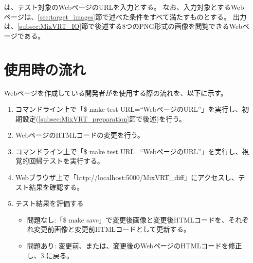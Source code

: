 
\toolName は、テスト対象のWebページのURLを入力とする。
なお、入力対象とするWebページは、\ref{sec:target_images}節で述べた条件をすべて満たすものとする。
出力は、\ref{subsec:MixVRT_IO}節で後述する8つのPNG形式の画像を閲覧できるWebページである。
\section{\toolName 使用時の流れ}
Webページを作成している開発者が\toolName を使用する際の流れを、以下に示す。
\begin{enumerate}
      \item コマンドライン上で「\$ make test URL=“WebページのURL”」を実行し、初期設定(\ref{subsec:MixVRT_preparation}節で後述)を行う。
      \item WebページのHTMLコードの変更を行う。
      \item コマンドライン上で「\$ make test URL=“WebページのURL”」を実行し、視覚的回帰テストを実行する。
      \item Webブラウザ上で「http://localhost:5000/MixVRT\_diff」にアクセスし、テスト結果を確認する。
      \item テスト結果を評価する
            \begin{itemize}
                  \item 問題なし:「\$ make save」で変更後画像と変更後HTMLコードを、それぞれ変更前画像と変更前HTMLコードとして更新する。
                  \item 問題あり: 変更前、または、変更後のWebページのHTMLコードを修正し、3.に戻る。
            \end{itemize}
\end{enumerate}



